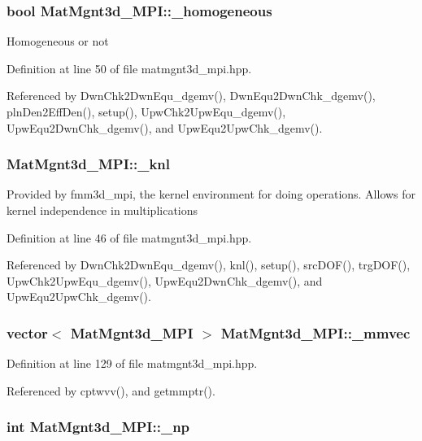 \subsubsection{\setlength{\rightskip}{0pt plus 5cm}bool {\bf Mat\-Mgnt3d\_\-MPI::\_\-homogeneous}}\label{classMatMgnt3d__MPI_189fa21bdb319a2bd48c39665b10a53c_189fa21bdb319a2bd48c39665b10a53c}


Homogeneous or not 

Definition at line 50 of file matmgnt3d\_\-mpi.hpp.

Referenced by Dwn\-Chk2Dwn\-Equ\_\-dgemv(), Dwn\-Equ2Dwn\-Chk\_\-dgemv(), pln\-Den2Eff\-Den(), setup(), Upw\-Chk2Upw\-Equ\_\-dgemv(), Upw\-Equ2Dwn\-Chk\_\-dgemv(), and Upw\-Equ2Upw\-Chk\_\-dgemv().
\subsubsection{ {\bf Mat\-Mgnt3d\_\-MPI::\_\-knl}}\label{classMatMgnt3d__MPI_cb56a4f532a89bc1a51ee17c2434a106_cb56a4f532a89bc1a51ee17c2434a106}


Provided by fmm3d\_\-mpi, the kernel environment for doing operations. Allows for kernel independence in multiplications 

Definition at line 46 of file matmgnt3d\_\-mpi.hpp.

Referenced by Dwn\-Chk2Dwn\-Equ\_\-dgemv(), knl(), setup(), src\-DOF(), trg\-DOF(), Upw\-Chk2Upw\-Equ\_\-dgemv(), Upw\-Equ2Dwn\-Chk\_\-dgemv(), and Upw\-Equ2Upw\-Chk\_\-dgemv().
\subsubsection{\setlength{\rightskip}{0pt plus 5cm}vector$<$ {\bf Mat\-Mgnt3d\_\-MPI} $>$ {\bf Mat\-Mgnt3d\_\-MPI::\_\-mmvec}\hspace{0.3cm}{\tt  [static]}}\label{classMatMgnt3d__MPI_cb639bda4a8ef940adb1d3495123f208_cb639bda4a8ef940adb1d3495123f208}




Definition at line 129 of file matmgnt3d\_\-mpi.hpp.

Referenced by cptwvv(), and getmmptr().
\subsubsection{\setlength{\rightskip}{0pt plus 5cm}int {\bf Mat\-Mgnt3d\_\-MPI::\_\-np}}\label{classMatMgnt3d__MPI_3d05941198fa7da648bc68ddd5d0b5c1_3d05941198fa7da648bc68ddd5d0b5c1}


